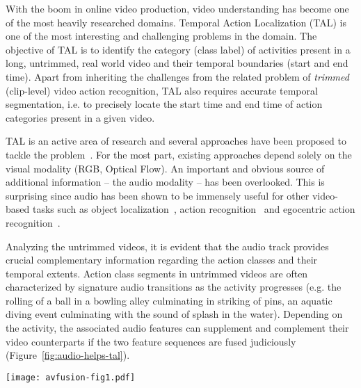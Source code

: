 \documentclass[10pt,twocolumn,letterpaper]{article}
\begin{document}
With the boom in online video production, video understanding has become one of the most heavily researched domains. Temporal Action Localization (TAL) is one of the most interesting and challenging problems in the domain. The objective of TAL is to identify the category (class label) of activities present in a long, untrimmed, real world video and their temporal boundaries (start and end time). Apart from inheriting the challenges from the related problem of \textit{trimmed} (clip-level) video action recognition, TAL also requires accurate temporal segmentation, i.e. to precisely locate the start time and end time of action categories present in a given video.

TAL is an active area of research and several approaches have been proposed to tackle the problem~\cite{Xu_2020_CVPR,PGCN2019ICCV,DBLP:journals/corr/abs-2011-11479,Liu_2021_CVPR,Liu_2021_CVPR,Lin_2021_CVPR}. For the most part, existing approaches depend solely on the visual modality (RGB, Optical Flow). An important and obvious source of additional information  -- the audio modality -- has been overlooked. This is surprising since audio has been shown to be immensely useful for other video-based tasks such as object localization~\cite{8237335}, action recognition~\cite{DBLP:conf/eccv/OwensE18,10.1145/2964284.2964328,8578915,b1bace6f29a746caa54afb1f42bcbf36,DBLP:journals/ijcv/OwensWMFT18} and egocentric action recognition~\cite{9010900}. 

Analyzing the untrimmed videos, it is evident that the audio track provides crucial complementary information regarding the action classes and their temporal extents. Action class segments in untrimmed videos are often characterized by signature audio transitions as the activity progresses (e.g. the rolling of a ball in a bowling alley culminating in striking of pins, an aquatic diving event culminating with the sound of splash in the water). Depending on the activity, the associated audio features can supplement and complement their video counterparts if the two feature sequences are fused judiciously (Figure~\ref{fig:audio-helps-tal}).

\begin{figure*}
\centering
\texttt{[image: avfusion-fig1.pdf]}
\caption{An example illustrating a scenario where audio modality can help improve peformance over video-only temporal action localization.} 
\label{fig:audio-helps-tal}
\end{figure*}
\end{document}
